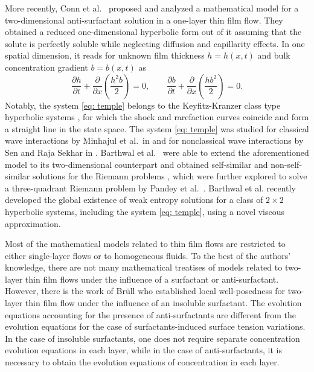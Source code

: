 \documentclass[11pt]{article}
\numberwithin{equation}{section}
\newtheorem{counter example}[theorem]{Counter Example}
\begin{document}
{More recently, Conn et al.~\cite{conn2017simple, conn2016fluid} proposed and analyzed a mathematical model for a two-dimensional anti-surfactant solution in a one-layer thin film flow.  They obtained a reduced one-dimensional hyperbolic form out of it assuming that the solute is perfectly soluble while neglecting diffusion and capillarity effects. In one spatial dimension, it reads for unknown film thickness $h=h(x, t)$  and bulk concentration gradient $b=b(x, t)$ as
\begin{equation}
\label{eq: temple}
 \dfrac{\partial h}{\partial t}+\dfrac{\partial }{\partial x}\left(\dfrac{h^2b}{2}\right)=0,\qquad
    \dfrac{\partial b}{\partial t}+\dfrac{\partial}{\partial x}\left(\dfrac{hb^2}{2}\right)=0.
\end{equation} 
Notably, the system \eqref{eq: temple} belongs to the Keyfitz-Kranzer class type hyperbolic systems \cite{temple1983systems}, for which the shock and rarefaction curves coincide and form a straight line in the state space. The system \eqref{eq: temple} was studied for classical wave interactions by Minhajul et al.~in \cite{sekhar2019stability} and for nonclassical wave interactions by Sen and Raja Sekhar in \cite{sen2020delta}. Barthwal et al.~\cite{barthwal2023construction} were able to extend the aforementioned model to its two-dimensional counterpart and obtained self-similar and non-self-similar solutions for the Riemann problems \cite{barthwal2022two, barthwal2023construction}, which were further explored to solve a three-quadrant Riemann problem by Pandey et al.~\cite{anamika2024Riemann}. Barthwal et al. \cite{barthwal2026existence} recently developed the global existence of weak entropy solutions for a class of $2\times 2$ hyperbolic systems, including the system \eqref{eq: temple}, using a novel viscous approximation.

Most of the mathematical models related to thin film flows are restricted to either single-layer flows or to homogeneous fluids. To the best of the authors' knowledge, there are not many mathematical treatises of models related to two-layer thin film flows under the influence of a surfactant or anti-surfactant. However,  there is the work of Br\"ull \cite{bruell2016modeling} who established local well-posedness for two-layer thin film flow under the influence of an insoluble surfactant.  
The evolution equations accounting for the presence of anti-surfactants are different from the evolution equations for the case of surfactants-induced surface tension variations. In the case of insoluble surfactants, one does not require separate concentration evolution equations in each layer, while in the case of anti-surfactants, it is necessary to obtain the evolution equations of concentration in each layer.

}
\end{document}
